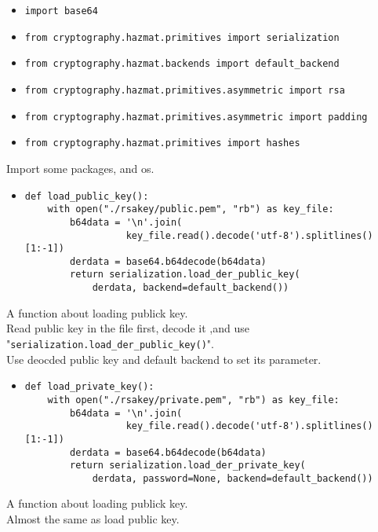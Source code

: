 \documentclass{article}
\begin{document}
\begin{itemize}
\item \verb|import base64|
\item \verb|from cryptography.hazmat.primitives import serialization|
\item \verb|from cryptography.hazmat.backends import default_backend|
\item \verb|from cryptography.hazmat.primitives.asymmetric import rsa|
\item \verb|from cryptography.hazmat.primitives.asymmetric import padding|
\item \verb|from cryptography.hazmat.primitives import hashes|
\end{itemize}

\noindent Import some packages, and os.

\begin{itemize}
\item \begin{verbatim}def load_public_key():
    with open("./rsakey/public.pem", "rb") as key_file:
        b64data = '\n'.join(
                  key_file.read().decode('utf-8').splitlines()[1:-1])
        derdata = base64.b64decode(b64data)
        return serialization.load_der_public_key(
            derdata, backend=default_backend())
\end{verbatim}
\end{itemize}

\noindent A function about loading publick key.\\
Read public key in the file first, decode it ,and use "\verb|serialization.load_der_public_key()|".\\
Use deocded public key and default backend to set its parameter. 

\begin{itemize}
\item \begin{verbatim}def load_private_key():
    with open("./rsakey/private.pem", "rb") as key_file:
        b64data = '\n'.join(
                  key_file.read().decode('utf-8').splitlines()[1:-1])
        derdata = base64.b64decode(b64data)
        return serialization.load_der_private_key(
            derdata, password=None, backend=default_backend())
\end{verbatim}
\end{itemize}

\noindent A function about loading publick key.\\
Almost the same as load public key.
\end{document}
